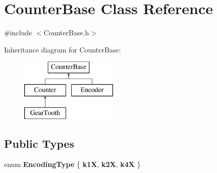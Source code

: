 \hypertarget{classCounterBase}{
\section{CounterBase Class Reference}
\label{classCounterBase}
}


{\ttfamily \#include $<$CounterBase.h$>$}

Inheritance diagram for CounterBase:\begin{figure}[H]
\begin{center}
\leavevmode
\includegraphics[height=3.000000cm]{classCounterBase}
\end{center}
\end{figure}
\subsection*{Public Types}
\begin{DoxyCompactItemize}
\item 
enum {\bfseries EncodingType} \{ {\bfseries k1X}, 
{\bfseries k2X}, 
{\bfseries k4X}
 \}
\end{DoxyCompactItemize}
